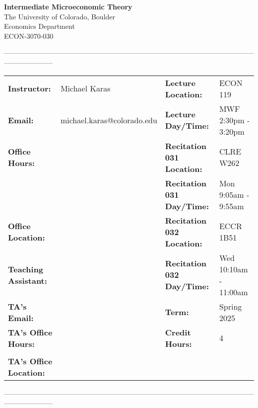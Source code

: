 \documentclass[11pt]{article}
\begin{document}
\begin{center}
\textbf{\Large Intermediate Microeconomic Theory}\\
The University of Colorado, Boulder\\ Economics Department\\ ECON-3070-030
\end{center}

---------------------------------------------------------------------------------------------------------------------------------
\vspace{-.1in}
\begin{center}
\begin{tabular}{llll}
    \textbf{Instructor:} & \footnotesize{Michael Karas}  &   \textbf{Lecture Location:}  & \footnotesize{ECON 119}\\ 
    \textbf{Email:} & \footnotesize{michael.karas@colorado.edu} &   \textbf{Lecture Day/Time:} & \footnotesize{MWF 2:30pm - 3:20pm}\\
    \textbf{Office Hours:} & \footnotesize{}   &  \textbf{Recitation 031 Location:} & \footnotesize{CLRE W262} \\
    \textbf{} & \footnotesize{}   &  \textbf{Recitation 031 Day/Time:} & \footnotesize{Mon 9:05am - 9:55am} \\
    \textbf{Office Location:} & \footnotesize{}  & \textbf{Recitation 032 Location:} & \footnotesize{ECCR 1B51}\\
    \textbf{Teaching Assistant:} & \footnotesize{}   & \textbf{Recitation 032 Day/Time:} & \footnotesize{Wed 10:10am - 11:00am}\\
    \textbf{TA's Email:} & \footnotesize{}   & \textbf{Term:} & \footnotesize{Spring 2025}\\
    \textbf{TA's Office Hours:} & \footnotesize{}   & \textbf{Credit Hours:} & \footnotesize{4}\\
    \textbf{} & \footnotesize{}   &  \textbf{} & \footnotesize{} \\
        \textbf{TA's Office Location:} & \footnotesize{}   & \textbf{} & \\
\end{tabular}
\end{center}

---------------------------------------------------------------------------------------------------------------------------------
\end{document}
